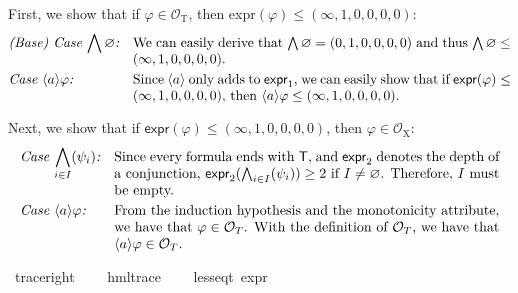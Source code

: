 \begin{isabellebody}
\begin{isamarkuptext}
First, we show that if $\varphi \in \mathcal{O}_\text{T}$, then \textsf{expr}$(\varphi) \leq (\infty, 1, 0, 0, 0, 0)$:
\begin{align*}
&\textit{(Base) Case $\bigwedge\varnothing$:} &&\parbox[t]{0.8\textwidth}{We can easily derive that $\bigwedge\varnothing = (0, 1, 0, 0, 0, 0)$ and thus $\bigwedge\varnothing \leq (\infty, 1, 0, 0, 0, 0)$.}\\
&\textit{Case $\langle a \rangle \varphi$:} &&\parbox[t]{0.8\textwidth}{Since $\langle a \rangle$ only adds to $\textsf{expr}_1$, we can easily show that if $\textsf{expr}(\varphi) \leq (\infty, 1, 0, 0, 0, 0)$, then $\langle a \rangle\varphi \leq (\infty, 1, 0, 0, 0, 0)$.}
\end{align*}%
\end{isamarkuptext}\isamarkuptrue%
%
\begin{isamarkuptext}%
Next, we show that if $\textsf{expr}(\varphi) \leq (\infty, 1, 0, 0, 0, 0)$, then $\varphi \in \mathcal{O}_\text{X}$:
\begin{align*}
&\textit{Case $\bigwedge_{i\in I}(\psi_i)$:} &&\parbox[t]{0.8\textwidth}{Since every formula ends with \textsf{T}, and $\textsf{expr}_2$ denotes the depth of a conjunction, $\textsf{expr}_2(\bigwedge_{i\in I}(\psi_i)) \geq 2$ if $I\neq\varnothing$. Therefore, $I$ must be empty.} \\
&\textit{Case $\langle a \rangle\varphi$:} &&\parbox[t]{0.8\textwidth}{From the induction hypothesis and the monotonicity attribute, we have that $\varphi\in\mathcal{O}_T$. With the definition of $\mathcal{O}_T$, we have that $\langle a \rangle\varphi\in\mathcal{O}_T$.}
\end{align*}%
\end{isamarkuptext}\isamarkuptrue%
%
\isadelimvisible
%
\endisadelimvisible
%
\isatagvisible
%
\endisatagvisible
{\isafoldvisible}%
%
\isadelimvisible
\isanewline
%
\endisadelimvisible
{}\isamarkupfalse%
\ trace{\isacharunderscore}{\kern0pt}right{\isacharcolon}{\kern0pt}\ \isanewline
\ \ \ {\isachardoublequoteopen}hml{\isacharunderscore}{\kern0pt}trace\ {\isasymphi}{\isachardoublequoteclose}\isanewline
\ \ \ {\isachardoublequoteopen}{\isacharparenleft}{\kern0pt}less{\isacharunderscore}{\kern0pt}eq{\isacharunderscore}{\kern0pt}t\ {\isacharparenleft}{\kern0pt}expr\ {\isasymphi}{\isacharparenright}{\kern0pt}\ {\isacharparenleft}{\kern0pt}{\isasyminfinity}{\isacharcomma}{\kern0pt}\ {}{\isacharcomma}{\kern0pt}\ {}{\isacharcomma}{\kern0pt}\ {}{\isacharcomma}{\kern0pt}\ {}{\isacharcomma}{\kern0pt}\ {}{\isacharparenright}{\kern0pt}{\isacharparenright}{\kern0pt}{\isachardoublequoteclose}\isanewline

\end{isabellebody}
